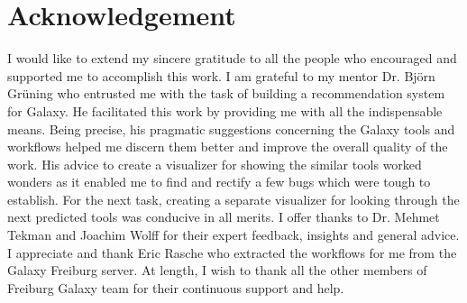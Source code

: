 \chapter*{Acknowledgement}

I would like to extend my sincere gratitude to all the people who encouraged and supported me to accomplish this work. I am grateful to my mentor Dr. Björn Grüning who entrusted me with the task of building a recommendation system for Galaxy. He facilitated this work by providing me with all the indispensable means. Being precise, his pragmatic suggestions concerning the Galaxy tools and workflows helped me discern them better and improve the overall quality of the work. His advice to create a visualizer for showing the similar tools worked wonders as it enabled me to find and rectify a few bugs which were tough to establish. For the next task, creating a separate visualizer for looking through the next predicted tools was conducive in all merits. I offer thanks to Dr. Mehmet Tekman and Joachim Wolff for their expert feedback, insights and general advice. I appreciate and thank Eric Rasche who extracted the workflows for me from the Galaxy Freiburg server. At length, I wish to thank all the other members of Freiburg Galaxy team for their continuous support and help.

